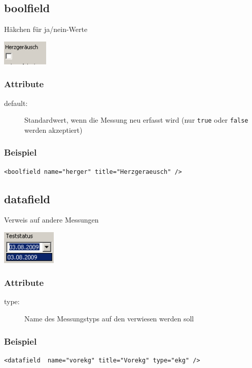 \documentclass[a4paper]{scrartcl}
\begin{document}
\subsection{boolfield}
Häkchen für ja/nein-Werte
\begin{center}
    \includegraphics[width=2.2cm]{images/boolfield.png}
\end{center}
\subsubsection{Attribute}
\begin{description}
    \item[default:] Standardwert, wenn die Messung neu erfasst wird (nur
                    \texttt{true} oder \texttt{false} werden akzeptiert)
\end{description}
\subsubsection{Beispiel}
\begin{lstlisting}
<boolfield name="herger" title="Herzgeraeusch" />
\end{lstlisting}

\subsection{datafield}
Verweis auf andere Messungen
\begin{center}
    \includegraphics[width=2.6cm]{images/datafield.png}
\end{center}
\subsubsection{Attribute}
\begin{description}
    \item[type:] Name des Messungstyps auf den verwiesen werden soll
\end{description}
\subsubsection{Beispiel}
\begin{lstlisting}
<datafield  name="vorekg" title="Vorekg" type="ekg" />
\end{lstlisting}
\end{document}
